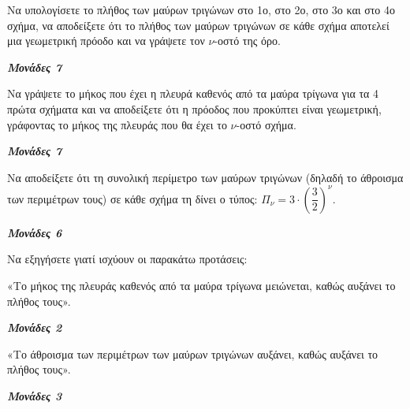 \documentclass[11pt,a4paper,twoside]{book}
\newcommand{\monades}[1]{
\hspace*{\fill}
\textbf{\textit{\textcolor{maincolor}{Μονάδες #1}}}}
\begin{document}
\begin{alist}
\item Να υπολογίσετε το πλήθος των μαύρων τριγώνων στο 1ο, στο 2ο, στο 3ο και στο 4ο σχήμα, να αποδείξετε ότι το πλήθος των μαύρων τριγώνων σε κάθε σχήμα αποτελεί μια γεωμετρική πρόοδο και να γράψετε τον $\nu$-οστό της όρο.
\monades{7}
\item Να γράψετε το μήκος που έχει η πλευρά καθενός από τα μαύρα τρίγωνα για τα 4 πρώτα σχήματα και να αποδείξετε ότι η πρόοδος που προκύπτει είναι γεωμετρική, γράφοντας το μήκος της πλευράς που θα έχει το $\nu$-οστό σχήμα.
\monades{7}
\item Να αποδείξετε ότι τη συνολική περίμετρο των μαύρων τριγώνων (δηλαδή το άθροισμα των περιμέτρων τους) σε κάθε σχήμα τη δίνει ο τύπος: $\Pi_{\nu} = 3 \cdot \left(\dfrac{3}{2}\right)^{\nu}$.
\monades{6}
\item Να εξηγήσετε γιατί ισχύουν οι παρακάτω προτάσεις:
\begin{rlist}
\item «Το μήκος της πλευράς καθενός από τα μαύρα τρίγωνα μειώνεται, καθώς αυξάνει το πλήθος τους».
\monades{2}
\item «Το άθροισμα των περιμέτρων των μαύρων τριγώνων αυξάνει, καθώς αυξάνει το πλήθος τους».
\monades{3}
\end{rlist}
\end{alist}

\vspace{4mm}
\end{document}
